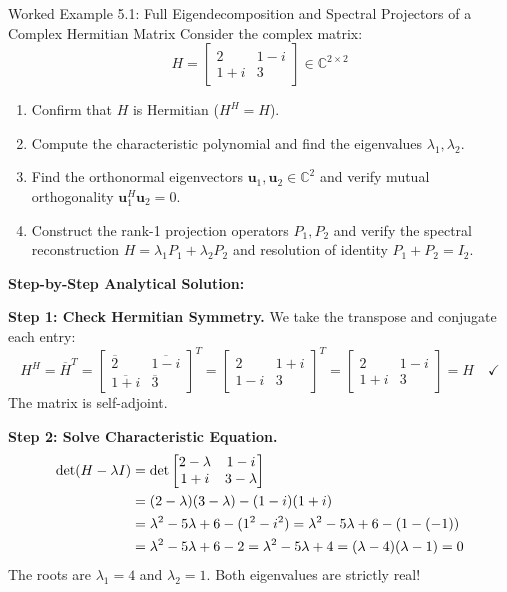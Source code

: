 \begin{examplebox}{Worked Example 5.1: Full Eigendecomposition and Spectral Projectors of a Complex Hermitian Matrix}
\label{ex:w05_hermitian_spectral_projectors}
Consider the complex matrix:
\begin{equation}
H = \begin{bmatrix} 2 & 1 - i \\ 1 + i & 3 \end{bmatrix} \in \mathbb{C}^{2 \times 2}
\end{equation}
\begin{enumerate}
    \item Confirm that $H$ is Hermitian ($H^H = H$).
    \item Compute the characteristic polynomial and find the eigenvalues $\lambda_1, \lambda_2$.
    \item Find the orthonormal eigenvectors $\mathbf{u}_1, \mathbf{u}_2 \in \mathbb{C}^2$ and verify mutual orthogonality $\mathbf{u}_1^H \mathbf{u}_2 = 0$.
    \item Construct the rank-1 projection operators $P_1, P_2$ and verify the spectral reconstruction $H = \lambda_1 P_1 + \lambda_2 P_2$ and resolution of identity $P_1 + P_2 = I_2$.
\end{enumerate}

\tcblower
\textbf{Step-by-Step Analytical Solution:}

\textbf{Step 1: Check Hermitian Symmetry.}
We take the transpose and conjugate each entry:
\begin{equation}
H^H = \overline{H}^T = \begin{bmatrix} \overline{2} & \overline{1 - i} \\ \overline{1 + i} & \overline{3} \end{bmatrix}^T = \begin{bmatrix} 2 & 1 + i \\ 1 - i & 3 \end{bmatrix}^T = \begin{bmatrix} 2 & 1 - i \\ 1 + i & 3 \end{bmatrix} = H \quad \checkmark
\end{equation}
The matrix is self-adjoint.

\textbf{Step 2: Solve Characteristic Equation.}
\begin{align}
\det(H - \lambda I) &= \det\begin{bmatrix} 2 - \lambda & 1 - i \\ 1 + i & 3 - \lambda \end{bmatrix} \notag \\
&= (2 - \lambda)(3 - \lambda) - (1 - i)(1 + i) \notag \\
&= \lambda^2 - 5\lambda + 6 - (1^2 - i^2) = \lambda^2 - 5\lambda + 6 - (1 - (-1)) \notag \\
&= \lambda^2 - 5\lambda + 6 - 2 = \lambda^2 - 5\lambda + 4 = (\lambda - 4)(\lambda - 1) = 0
\end{align}
The roots are $\lambda_1 = 4$ and $\lambda_2 = 1$. Both eigenvalues are strictly real!


\end{examplebox}
